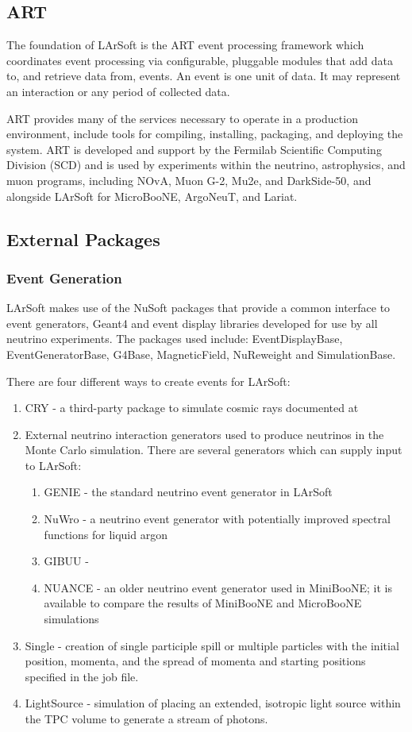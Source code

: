 \documentclass[12pt]{elsarticle}
\begin{document}
\subsection{ART}
The foundation of LArSoft is the ART event processing framework which coordinates event processing via configurable, pluggable modules that add data to, and retrieve data from, events.\cite{art-ref}  An event is one unit of data. It may represent an interaction or any period of collected data.

ART provides many of the services necessary to operate in a production environment, include tools for compiling, installing, packaging, and deploying the system.  ART is developed and support by the Fermilab Scientific Computing Division (SCD) and is used by experiments within the neutrino, astrophysics, and muon programs, including NOvA, Muon G-2, Mu2e, and DarkSide-50, and alongside LArSoft for MicroBooNE, ArgoNeuT, and Lariat.

\subsection{External Packages}
\subsubsection{Event Generation}
LArSoft makes use of the NuSoft packages that provide a common interface to event generators, Geant4 and event display libraries developed for use by all neutrino experiments. The packages used include:    EventDisplayBase, EventGeneratorBase, G4Base, MagneticField, NuReweight and SimulationBase.

There are four different ways to create events for LArSoft:
\begin{enumerate}
\item{CRY - a third-party package to simulate cosmic rays documented at \cite{cry}}
\item{External neutrino interaction generators used to produce neutrinos in the Monte Carlo simulation. There are several generators which can supply input to LArSoft:}
\begin{enumerate}
\item{GENIE\cite{genie} - the standard neutrino event generator in LArSoft}
\item{NuWro\cite{nuwro} - a neutrino event generator with potentially improved spectral functions for liquid argon}
\item{GIBUU\cite{gibuu} - }
\item{NUANCE\cite{nuance} - an older neutrino event generator used in MiniBooNE; it is available to compare the results of MiniBooNE and MicroBooNE simulations}
\end{enumerate}
\item{Single - creation of single participle spill or multiple particles with the initial position, momenta, and the spread of momenta and starting positions specified in the job file.}
\item{LightSource - simulation of placing an extended, isotropic light source within the TPC volume to generate a stream of photons.}
\end{enumerate}
\end{document}
